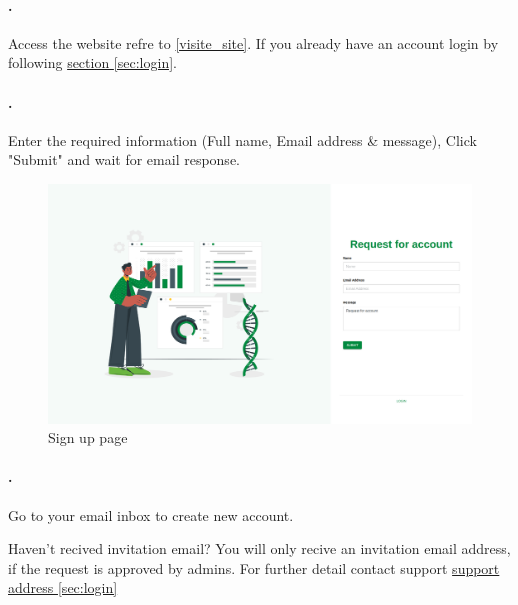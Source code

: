 
\setcounter{stepcounter}{1}

\paragraph{.}Access the website refre to \ref{visite_site}.
If you already have an account login by following  \hyperref[sec:login]{section \ref{sec:login}}.

\paragraph{.} Enter the required information (Full name, Email address \& message), Click "Submit" and wait for email response.
\begin{figure}[h!]
  	\includegraphics[width=15cm]{screenshots/sign_up_page.png}
  	\caption{Sign up page}
  	\label{fig:sign_up_page}
\end{figure}

\paragraph{.} Go to your email inbox to create new account.

\begin{myremark}{Haven't recived invitation email?}\label{visite_site}
You will only recive an invitation email address, if the request is approved by admins. For further detail contact support \hyperref[sec:login]{support address \ref{sec:login}}
\end{myremark}

